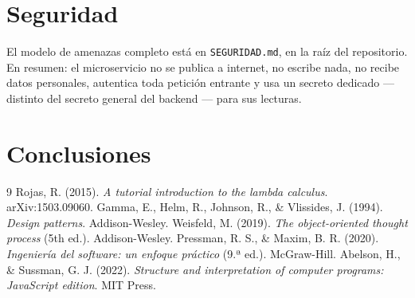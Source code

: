 \documentclass[11pt,letterpaper]{article}
\begin{document}
\section{Seguridad}
El modelo de amenazas completo está en \texttt{SEGURIDAD.md}, en la raíz del
repositorio. En resumen: el microservicio no se publica a internet, no escribe
nada, no recibe datos personales, autentica toda petición entrante y usa un
secreto dedicado --- distinto del secreto general del backend --- para sus
lecturas.

\section{Conclusiones}

\begin{thebibliography}{9}
 Rojas, R. (2015). \emph{A tutorial introduction to the lambda calculus}. arXiv:1503.09060.
 Gamma, E., Helm, R., Johnson, R., \& Vlissides, J. (1994). \emph{Design patterns}. Addison-Wesley.
 Weisfeld, M. (2019). \emph{The object-oriented thought process} (5th ed.). Addison-Wesley.
 Pressman, R. S., \& Maxim, B. R. (2020). \emph{Ingeniería del software: un enfoque práctico} (9.ª ed.). McGraw-Hill.
 Abelson, H., \& Sussman, G. J. (2022). \emph{Structure and interpretation of computer programs: JavaScript edition}. MIT Press.
\end{thebibliography}
\end{document}
